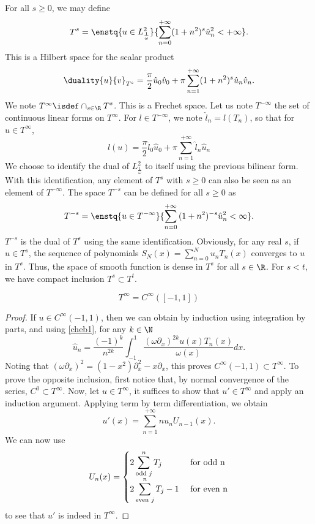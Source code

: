 \documentclass[]{article}
\begin{document}
\begin{Def}
	For all $s \geq 0$, we may define 
	\[T^s = \enstq{ u \in L^2_\frac{1}{\omega}}{ \sum_{n=0}^{+\infty}(1+n^2)^s \hat{u}_n^2 < + \infty}.\]
	This is a Hilbert space for the scalar product
	\[\duality{u}{v}_{T^s} = \frac{\pi}{2}\hat{u}_0 \hat{v}_0 + \pi\sum_{n=1}^{+\infty}(1+n^2)^s\hat{u}_n \hat{v}_n.\]
	We note $T^{\infty} \isdef \displaystyle\cap_{s \in \R} T^s$. This is a Frechet space. Let us note $T^{-\infty}$ the set of continuous linear forms on $T^{\infty}$. For $l \in T^{-\infty}$, we note $\hat{l}_n = l(T_n)$, so that for $u \in T^{\infty}$, 
	\[l(u) = \frac{\pi}{2}\hat{l}_0 \hat{u}_0 + \pi \sum_{n=1}^{+\infty} \hat{l}_n \hat{u}_n\] 
	We choose to identify the dual of $L^2_\frac{1}{\omega}$ to itself using the previous bilinear form.  With this identification, any element of $T^s$ with $s \geq 0$ can also be seen as an element of $T^{-\infty}$.  
	The space $T^{-s}$ can be defined for all $s \geq 0$ as
	\[T^{-s} = \enstq{ u \in T^{-\infty}}{ \sum_{n=0}^{+\infty}{(1 + n^2)^{-s} \hat{u}_n^2} < \infty}.\]
	$T^{-s}$ is the dual of $T^s$ using the same identification. Obviously, for any real $s$, if $u \in T^s$, the sequence of polynomials $S_N(x) = \sum_{n=0}^{N} u_n T_n(x)$ converges to $u$ in $T^s$. Thus, the space of smooth function is dense in $T^s$ for all $s \in \R$. For $s < t$, we have compact inclusion $T^s \subset T^t$.
\end{Def}
\begin{Lem}
	\[T^{\infty} = C^{\infty}([-1,1])\]
	\begin{proof}
		If $u \in C^{\infty}(-1,1)$, then we can obtain by induction using integration by parts, and using \eqref{cheb1}, for any $k \in \N$
		\[\hat{u}_n = \frac{(-1)^k}{n^{2k}} \int_{-1}^{1} \dfrac{(\omega\partial_x)^{2k} u(x) T_n(x)}{\omega(x)}dx.\]
		Noting that $(\omega \partial_x)^2 = (1-x^2)\partial_x^2 - x \partial_ x$, this proves $C^{\infty}(-1,1) \subset T^{\infty}$. To prove the opposite inclusion, first notice that, by normal convergence of the series, $C^0 \subset T^{\infty}$. Now, let $u \in T^{\infty}$, it suffices to show that $u' \in T^{\infty}$ and apply an induction argument. Applying term by term differentiation, we obtain
		\[u'(x) = \sum_{n=1}^{+\infty} n u_n U_{n-1}(x).\] 
		We can now use 
		\[U_n(x) = \begin{cases}
		2\displaystyle\sum_{\textup{odd } j}^n T_j & \textup{ for odd } $n$\\
		2\displaystyle\sum_{\textup{even } j}^n T_j - 1& \textup{ for even } $n$
		\end{cases}\]
		to see that $u'$ is indeed in $T^{\infty}$. 
	\end{proof}
\end{Lem}
\end{document}
